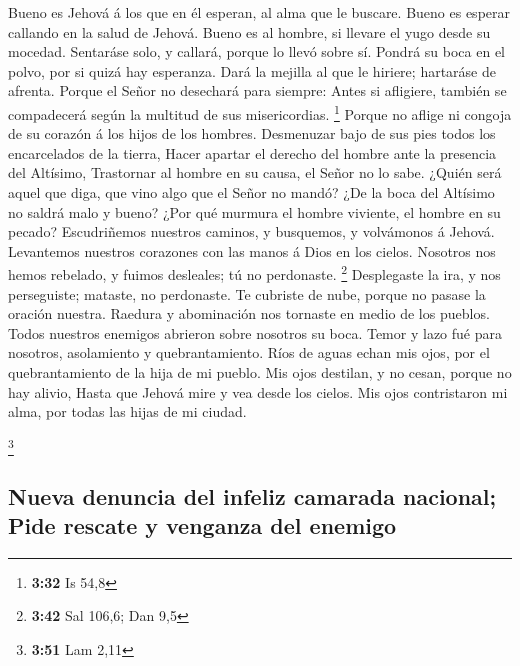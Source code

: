  Bueno es Jehová á los que en él esperan, al alma que le
buscare.  Bueno es esperar callando en la salud de
Jehová.  Bueno es al hombre, si llevare el yugo desde su
mocedad.  Sentaráse solo, y callará, porque lo llevó
sobre sí.  Pondrá su boca en el polvo, por si quizá hay
esperanza.  Dará la mejilla al que le hiriere; hartaráse
de afrenta.  Porque el Señor no desechará para siempre:
 Antes si afligiere, también se compadecerá según la
multitud de sus misericordias. \footnote{\textbf{3:32} Is 54,8}
 Porque no aflige ni congoja de su corazón á los hijos de
los hombres.  Desmenuzar bajo de sus pies todos los
encarcelados de la tierra,  Hacer apartar el derecho del
hombre ante la presencia del Altísimo,  Trastornar al
hombre en su causa, el Señor no lo sabe.  ¿Quién será
aquel que diga, que vino algo que el Señor no mandó?  ¿De
la boca del Altísimo no saldrá malo y bueno?  ¿Por qué
murmura el hombre viviente, el hombre en su pecado? 
Escudriñemos nuestros caminos, y busquemos, y volvámonos á Jehová.
 Levantemos nuestros corazones con las manos á Dios en
los cielos.  Nosotros nos hemos rebelado, y fuimos
desleales; tú no perdonaste. \footnote{\textbf{3:42} Sal 106,6; Dan 9,5}
 Desplegaste la ira, y nos perseguiste; mataste, no
perdonaste.  Te cubriste de nube, porque no pasase la
oración nuestra.  Raedura y abominación nos tornaste en
medio de los pueblos.  Todos nuestros enemigos abrieron
sobre nosotros su boca.  Temor y lazo fué para nosotros,
asolamiento y quebrantamiento.  Ríos de aguas echan mis
ojos, por el quebrantamiento de la hija de mi pueblo. 
Mis ojos destilan, y no cesan, porque no hay alivio, 
Hasta que Jehová mire y vea desde los cielos.  Mis ojos
contristaron mi alma, por todas las hijas de mi ciudad.

\footnote{\textbf{3:51} Lam 2,11}

\hypertarget{nueva-denuncia-del-infeliz-camarada-nacional-pide-rescate-y-venganza-del-enemigo}{%
\subsection{Nueva denuncia del infeliz camarada nacional; Pide rescate y
venganza del
enemigo}\label{nueva-denuncia-del-infeliz-camarada-nacional-pide-rescate-y-venganza-del-enemigo}}

